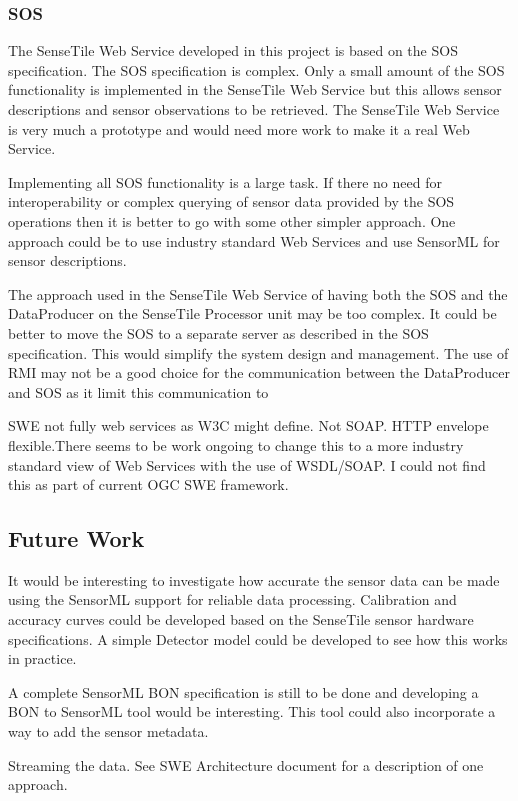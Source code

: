 \documentclass[]{final_report}
\begin{document}
\subsubsection{SOS}
The SenseTile Web Service developed in this project is based on the SOS specification. The SOS specification is complex. Only a small amount of the SOS functionality is implemented in the SenseTile Web Service but this allows sensor descriptions and sensor observations to be retrieved. The SenseTile Web Service is very much a prototype and would need more work to make it a real Web Service.

Implementing all SOS functionality is a large task. If there no need for interoperability or complex querying of sensor data provided by the SOS operations then it is better to go with some other simpler approach. One approach could be to use industry standard Web Services and use SensorML for sensor descriptions.

The approach used in the SenseTile Web Service of having both the SOS and the DataProducer on the SenseTile Processor unit may be too complex. It could be better to move the SOS to a separate server as described in the SOS specification. This would simplify the system design and management. The use of RMI may not be a good choice for the communication between the DataProducer and SOS as it limit this communication to 

SWE not fully web services as W3C might define. Not SOAP. HTTP envelope
flexible.There seems to be work ongoing to change this to a more industry standard view of Web Services with the use of WSDL/SOAP. I could not find this as part of current OGC SWE framework.

\subsection{Future Work}
It would be interesting to investigate how accurate the sensor data can be made using the SensorML support for reliable data processing. Calibration and accuracy curves could be developed based on the SenseTile sensor hardware specifications. A simple Detector model could be developed to see how this works in practice.

A complete SensorML BON specification is still to be done and developing a BON to SensorML tool would be interesting.
This tool could also incorporate a way to add the sensor metadata.

Streaming the data. See SWE Architecture document for a description of one approach.
\end{document}
